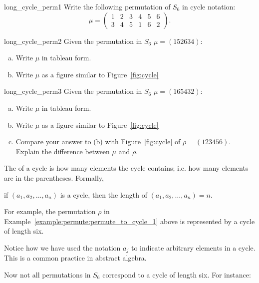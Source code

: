 \begin{exercise}{long_cycle_perm1}
Write the following permutation of $S_6$ in cycle notation:  
\[ \mu = \begin{pmatrix} 1 & 2 & 3 & 4 & 5 & 6 \\ 3 & 4 & 5 & 1 & 6 & 2 \end{pmatrix}. \]
\end{exercise}

\begin{exercise}{long_cycle_perm2}
Given the permutation in $S_6$ $\mu = (152634)$:
\begin{enumerate}[(a)]
\item
Write $\mu$ in tableau form.
\item
Write $\mu$ as a figure similar to Figure~\ref{fig:cycle}
\end{enumerate}
\end{exercise}

\begin{exercise}{long_cycle_perm3}
Given the permutation in $S_6$ $\mu = (165432)$:
\begin{enumerate}[(a)]
\item
Write $\mu$ in tableau form.
\item
Write $\mu$ as a figure similar to Figure~\ref{fig:cycle}
\item
Compare your answer to (b) with Figure~\ref{fig:cycle} of $\rho = (123456)$.  Explain the difference between $\mu$ and $\rho$. 
\end{enumerate}
\end{exercise}

\begin{defn} \label{cycle_length}
The  of a cycle is how many elements the cycle contains; i.e. how many elements are in the parentheses.  Formally, 
\begin{center}
if $(a_1, a_2, \ldots, a_n)$ is a cycle, then the length of $(a_1, a_2, \ldots, a_n) = n$.
\end{center}
\end{defn}
For example, the permutation $\rho$ in Example~\ref{example:permute:permute_to_cycle_1} above is represented by a cycle of length six.

\begin{rem}
Notice how we have used the notation $a_j$ to indicate arbitrary elements in a cycle.  This is a common practice in abstract algebra.
\end{rem}

Now not all permutations in $S_6$ correspond to a cycle of length six.  For instance:

